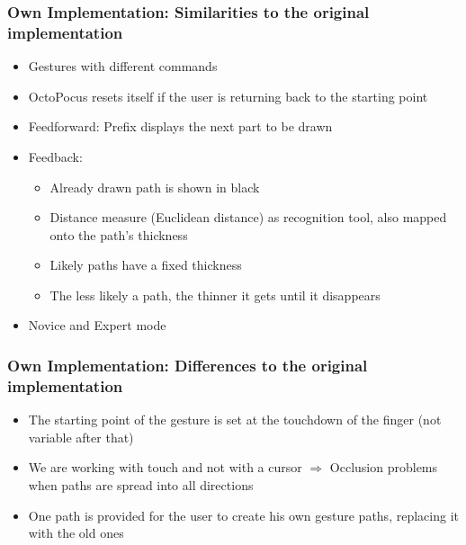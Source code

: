 \documentclass{beamer}
\begin{document}


\begin{frame}
\frametitle{Own Implementation: Similarities to the original implementation}

\begin{itemize}
\item Gestures with different commands
\pause
\item OctoPocus resets itself if the user is returning back to the starting point
\pause
\item Feedforward: Prefix displays the next part to be drawn
\pause
\item Feedback: 
	\begin{itemize}
	\pause
	\item Already drawn path is shown in black 
	\pause
	\item Distance measure (Euclidean distance) as recognition tool, also mapped onto the path's 				  thickness
	\pause
	\item Likely paths have a fixed thickness
	\pause
	\item The less likely a path, the thinner it gets until it disappears
	\pause
	\end{itemize}
\item Novice and Expert mode
\end{itemize}
\end{frame}


\begin{frame}
\frametitle{Own Implementation: Differences to the original implementation}

\begin{itemize}
\item The starting point of the gesture is set at the touchdown of the finger (not variable after that)
\pause
\item We are working with touch and not with a cursor \newline $\Rightarrow$ Occlusion problems when paths are spread into all directions
\pause
\item One path is provided for the user to create his own gesture paths, replacing it with the old ones 
\end{itemize}
\end{frame}

\end{document}
